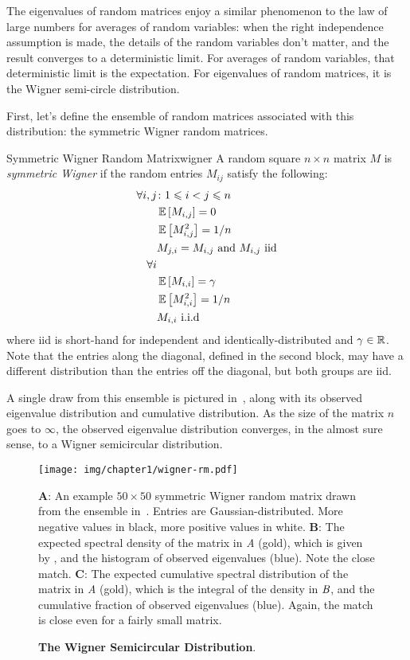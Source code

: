 \documentclass[../../thesis.tex]{subfiles}
\begin{document}
The eigenvalues of random matrices enjoy a similar phenomenon
to the law of large numbers for averages of random variables:
when the right independence assumption is made,
the details of the random variables don't matter,
and the result converges to a deterministic limit.
For averages of random variables,
that deterministic limit is the expectation.
For eigenvalues of random matrices,
it is the Wigner semi-circle distribution.

First, let's define the ensemble of random matrices
associated with this distribution:
the symmetric Wigner random matrices.
\begin{definition}{Symmetric Wigner Random Matrix}{wigner}
	A random square $n\times n$ matrix $M$ is \emph{symmetric Wigner}
	if the random entries $M_{ij}$ satisfy the following:
	\begin{align*}
		\forall i,j &\suchthat 1 \leq i < j \leq n\\
			&\Ex{M_{i, j}} = 0\\
			&\Ex{M_{i, j}^2} = 1/n\\
			&M_{j, i} = M_{i, j} \text{\ and\ } M_{i, j} \text{\ iid}\\
		\forall i\\
			&\Ex{M_{i, i}} = \gamma\\
			&\Ex{M_{i, i}^2} = 1/n\\
			&M_{i, i} \text{\ i.i.d}
	\end{align*}
	where iid is short-hand for independent
	and identically-distributed
	and $\gamma \in \mathbb{R}$.
	Note that the entries along the diagonal,
	defined in the second block,
	may have a different
	distribution than the entries off the diagonal,
	but both groups are iid.
\end{definition}

A single draw from this ensemble is pictured
in~,
along with its observed eigenvalue distribution
and cumulative distribution.
As the size of the matrix $n$ goes to $\infty$,
the observed eigenvalue distribution converges,
in the almost sure sense,
to a Wigner semicircular distribution.

\begin{figure}[ht]
	\begin{center}
		\texttt{[image: img/chapter1/wigner-rm.pdf]}
	\end{center}
	\caption{\textbf{The Wigner Semicircular Distribution}.}%
	{\textbf{A}: An example $50\times50$ symmetric Wigner random matrix drawn from the ensemble
		in~. Entries are Gaussian-distributed.
		More negative values in black, more positive values in white.
	\textbf{B}: The expected spectral density of the matrix in \emph{A} (gold),
		which is given by ,
		and the histogram of observed eigenvalues (blue). Note the close match.
	\textbf{C}: The expected cumulative spectral distribution
		of the matrix in \emph{A} (gold), which is the integral of the
		density in $\emph{B}$, and the cumulative fraction of observed eigenvalues (blue).
		Again, the match is close even for a fairly small matrix.
}
\end{figure}
\end{document}
